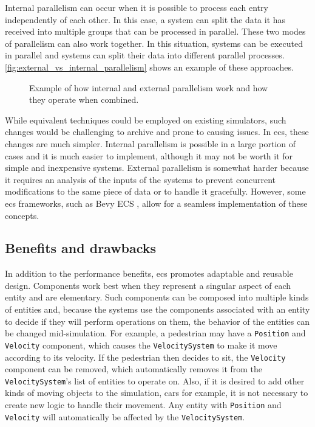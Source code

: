 \documentclass[twoside, 11pt]{article}
\begin{document}
Internal parallelism can occur when it is possible to process each entry independently of each other. In this case, a system can split the data it has received into multiple groups that can be processed in parallel. These two modes of parallelism can also work together. In this situation, systems can be executed in parallel and systems can split their data into different parallel processes. \autoref{fig:external_vs_internal_parallelism} shows an example of these approaches.

\begin{figure}[b!]
  \centering
  
  \caption[External and internal parallelism comparison]{Example of how internal and external parallelism work and how they operate when combined.}
  \label{fig:external_vs_internal_parallelism}
\end{figure}

While equivalent techniques could be employed on existing simulators, such changes would be challenging to archive and prone to causing issues. In \gls{ecs}, these changes are much simpler. Internal parallelism is possible in a large portion of cases and it is much easier to implement, although it may not be worth it for simple and inexpensive systems. External parallelism is somewhat harder because it requires an analysis of the inputs of the systems to prevent concurrent modifications to the same piece of data or to handle it gracefully. However, some \gls{ecs} frameworks, such as Bevy ECS \cite{bevy}, allow for a seamless implementation of these concepts.

\subsection{Benefits and drawbacks}

In addition to the performance benefits, \gls{ecs} promotes adaptable and reusable design. Components work best when they represent a singular aspect of each entity and are elementary. Such components can be composed into multiple kinds of entities and, because the systems use the components associated with an entity to decide if they will perform operations on them, the behavior of the entities can be changed mid-simulation. For example, a pedestrian may have a \verb|Position| and \verb|Velocity| component, which causes the \verb|VelocitySystem| to make it move according to its velocity. If the pedestrian then decides to sit, the \verb|Velocity| component can be removed, which automatically removes it from the \verb|VelocitySystem|'s list of entities to operate on. Also, if it is desired to add other kinds of moving objects to the simulation, cars for example, it is not necessary to create new logic to handle their movement. Any entity with \verb|Position| and \verb|Velocity| will automatically be affected by the \verb|VelocitySystem|.
\end{document}
